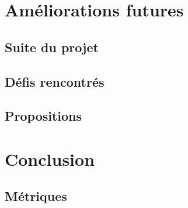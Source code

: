\documentclass{EPL-master-thesis-covers-FR}
\begin{document}
		

	\chapter{Améliorations futures}


		\section{Suite du projet}
			\label{ref:suite_projet}

		

		\section{Défis rencontrés}

			

		\section{Propositions}

			
	\chapter{Conclusion}

		

		\section{Métriques}
		

	{}
	
		

	

	\setlength{\parskip}{0em}
	\backcoverpage
\end{document}
